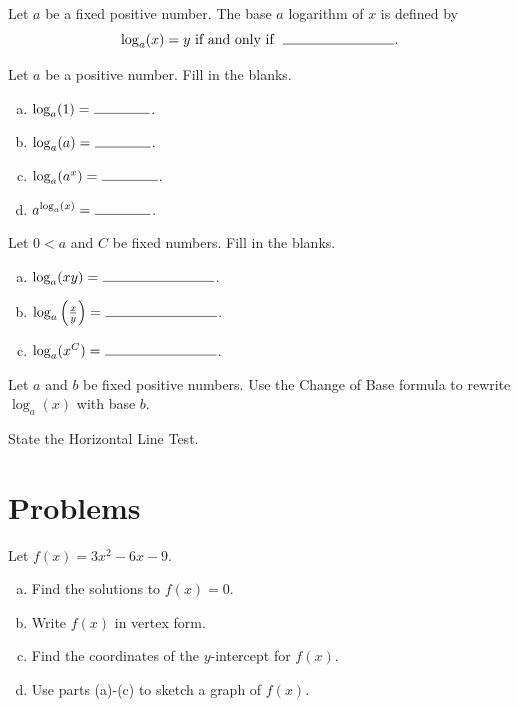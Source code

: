 \documentclass[12pt]{amsart}
\begin{document}
\begin{thm}[4 Points]\label{ex3}
  Let $a$ be a fixed positive number.
  The base $a$ logarithm of $x$ is defined by
  $$\log_a(x) = y\  \text{if and only if}\ \ \line(1,0){80}.$$
\end{thm}

\begin{thm}\label{ex4}
  Let $a$ be a positive number.  Fill in the blanks.
  \begin{enumerate}[(a)]
  \item
    $\log_a(1) = \ \line(1,0){40}$.
  \item
    $\log_a(a) = \ \line(1,0){40}$.
  \item
    $\log_a(a^x) = \ \line(1,0){40}$.
  \item
    $a^{\log_a(x)} = \ \line(1,0){40}$.
  \end{enumerate}
  \vspace{.5in}
\end{thm}

\begin{thm}
  Let $0 < a$ and $C$ be fixed numbers.  Fill in the blanks.
  \begin{enumerate}[(a)]
  \item
    $\log_a(xy) = \ \line(1,0){80}$.
  \item
    $\log_a\left(\frac{x}{y}\right) = \ \line(1,0){80}$.
  \item
    $\log_a(x^C) = \ \line(1,0){80}$.
  \end{enumerate}
  \vspace{.5in}
\end{thm}

\begin{thm}
  Let $a$ and $b$ be fixed positive numbers.
  Use the Change of Base formula to rewrite $\log_a(x)$ with base $b$.
  \vspace{1in}
\end{thm}

\begin{thm}
  State the Horizontal Line Test.
  \vspace{2in}
\end{thm}

\newpage
\section{Problems}

\begin{thm}\label{ex5}
  Let $f(x) = 3x^2 - 6x - 9$.
  \begin{enumerate}[(a)]
  \item
    Find the solutions to $f(x) = 0$.
    \vspace{2in}
  \item
    Write $f(x)$ in vertex form.
    \vspace{2in}
  \item
    Find the coordinates of the $y$-intercept for $f(x)$.
    \vspace{1in}
  \item
    Use parts (a)-(c) to sketch a graph of $f(x)$.
  \end{enumerate}
\end{thm}
\end{document}
